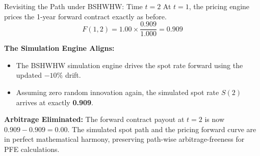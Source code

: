 \documentclass{beamer}
\begin{document}
	\begin{frame}{Revisiting the Path under BSHWHW: Time $t=2$}
		At $t=1$, the pricing engine prices the 1-year forward contract exactly as before.
		$$F(1, 2) = 1.00 \times \frac{0.909}{1.000} = \mathbf{0.909}$$
		
		\vspace{0.5cm}
		\textbf{The Simulation Engine Aligns:}
		\begin{itemize}
			\item The BSHWHW simulation engine drives the spot rate forward using the updated $-10\%$ drift.
			\item Assuming zero random innovation again, the simulated spot rate $S(2)$ arrives at exactly \textbf{0.909}.
		\end{itemize}
		
		\vspace{0.5cm}
		\textbf{Arbitrage Eliminated:}
		The forward contract payout at $t=2$ is now $0.909 - 0.909 = \mathbf{0.00}$. The simulated spot path and the pricing forward curve are in perfect mathematical harmony, preserving path-wise arbitrage-freeness for PFE calculations.
	\end{frame}
	
	
	
	
	
\end{document}
